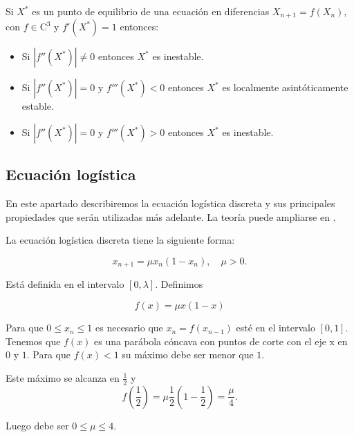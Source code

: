 \begin{proposition}
Si $X^*$ es un punto de equilibrio de una ecuación en diferencias $X_{n+1}=f(X_n)$, con $f\in\text{C}^3$ y $f'(X^*)=1$ entonces:
\begin{itemize}
\item Si $|f''(X^*)|\neq 0$ entonces $X^*$ es inestable.
\item Si $|f''(X^*)|=0$ y $f'''(X^*)<0$ entonces $X^*$ es localmente asintóticamente estable.
\item Si $|f''(X^*)|=0$ y $f'''(X^*)>0$ entonces $X^*$ es inestable.
\end{itemize}
\end{proposition}



\subsection{Ecuación logística}

En este apartado describiremos la ecuación logística discreta y sus principales propiedades que serán utilizadas más adelante. La teoría puede ampliarse en \cite{strogatzNonlinearDynamicsChaos1994}.

\begin{definition}
La ecuación logística discreta tiene la siguiente forma:

$$x_{n+1} = \mu x_n(1-x_n),\quad \mu > 0.$$

Está definida en el intervalo $ [ 0,\lambda ] $. Definimos

$$f(x)=\mu x(1-x)$$

Para que $0\leq x_n\leq 1$ es necesario que $x_n=f(x_{n-1})$ esté en el intervalo $[0,1]$. Tenemos que $f(x)$ es una parábola cóncava con puntos de corte con el eje x en $0$ y $1$. Para que $f(x)<1$ su máximo debe ser menor que $1$.

Este máximo se alcanza en $\frac{1}{2}$ y 
$$f\left(\frac{1}{2}\right) = \mu \frac{1}{2}\left(1-\frac{1}{2}\right) = \frac{\mu}{4}.$$

Luego debe ser $0\leq \mu \leq 4$.

\end{definition}


